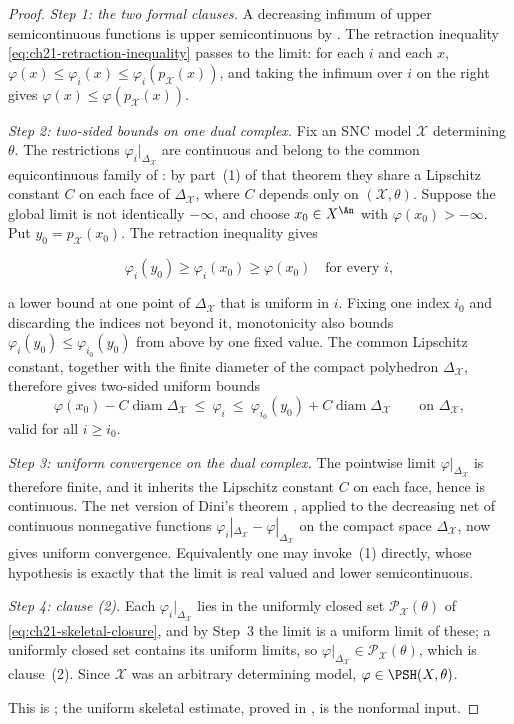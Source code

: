 \begin{proof}
\emph{Step 1: the two formal clauses.}
A decreasing infimum of upper semicontinuous functions is upper
semicontinuous by .  The retraction inequality
\eqref{eq:ch21-retraction-inequality} passes to the
limit: for each \(i\) and each \(x\), \(\varphi(x)\leq\varphi_i(x)\leq
\varphi_i(p_{\mathcal X}(x))\), and taking the infimum over \(i\) on the
right gives \(\varphi(x)\leq\varphi(p_{\mathcal X}(x))\).

\emph{Step 2: two-sided bounds on one dual complex.}
Fix an SNC model \(\mathcal X\) determining \(\theta\).  The restrictions
\(\varphi_i|_{\Delta_{\mathcal X}}\) are continuous and belong to the
common equicontinuous family of : by
part~(1) of that theorem they share a Lipschitz constant \(C\) on each face
of \(\Delta_{\mathcal X}\), where \(C\) depends only on
\((\mathcal X,\theta)\).  Suppose
the global limit is not identically \(-\infty\), and choose
\(x_0\in X^{\An}\) with \(\varphi(x_0)>-\infty\).  Put
\(y_0=p_{\mathcal X}(x_0)\).  The retraction inequality gives

\[
        \varphi_i(y_0)\geq\varphi_i(x_0)\geq\varphi(x_0)
        \quad\text{for every }i,
\]

a lower bound at one point of \(\Delta_{\mathcal X}\) that is uniform in
\(i\).  Fixing one index \(i_0\) and discarding the indices not beyond it,
monotonicity also bounds
\(\varphi_i(y_0)\leq\varphi_{i_0}(y_0)\) from above by one fixed value.
The common Lipschitz constant, together with the finite diameter of the
compact polyhedron \(\Delta_{\mathcal X}\), therefore gives two-sided
uniform bounds
\[
 \varphi(x_0)-C\operatorname{diam}\Delta_{\mathcal X}
 \ \leq\ \varphi_i\ \leq\
 \varphi_{i_0}(y_0)+C\operatorname{diam}\Delta_{\mathcal X}
 \qquad\text{on }\Delta_{\mathcal X},
\]
valid for all \(i\geq i_0\).

\emph{Step 3: uniform convergence on the dual complex.}
The pointwise limit \(\varphi|_{\Delta_{\mathcal X}}\) is therefore finite,
and it inherits the Lipschitz constant \(C\) on each face, hence is
continuous.  The net version of Dini's theorem
, applied to the decreasing net of continuous
nonnegative functions
\(\varphi_i|_{\Delta_{\mathcal X}}-
\varphi|_{\Delta_{\mathcal X}}\) on the compact space
\(\Delta_{\mathcal X}\), now gives uniform convergence.  Equivalently one
may invoke \Cref{prop:dini-usc}\,(1) directly, whose hypothesis is exactly
that the limit is real valued and lower semicontinuous.

\emph{Step 4: clause \textup{(2)}.}
Each \(\varphi_i|_{\Delta_{\mathcal X}}\) lies in the uniformly closed set
\(\mathcal P_{\mathcal X}(\theta)\) of \eqref{eq:ch21-skeletal-closure}, and
by Step~3 the limit is a uniform limit of these; a uniformly closed set
contains its uniform limits, so
\(\varphi|_{\Delta_{\mathcal X}}\in\mathcal P_{\mathcal X}(\theta)\), which
is clause~(2).  Since \(\mathcal X\) was an arbitrary determining model,
\(\varphi\in\PSH(X,\theta)\).

This is \cite[Corollary~7.9]{BFJ16}; the uniform
skeletal estimate, proved in , is the
nonformal input.
\end{proof}

